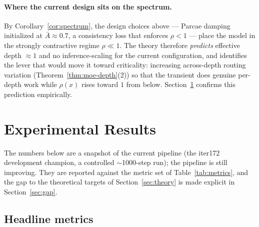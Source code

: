 \documentclass[11pt]{article}
\begin{document}
\paragraph{Where the current design sits on the spectrum.}
By Corollary~\ref{cor:spectrum}, the design choices above --- Parcae damping initialized at
$\bar A\approx0.7$, a consistency loss that enforces $\rho<1$ --- place the model in the strongly
contractive regime $\rho\ll1$.  The theory therefore \emph{predicts} effective depth
$\approx1$ and no inference-scaling for the current configuration, and identifies the lever that
would move it toward criticality: increasing across-depth routing variation
(Theorem~\ref{thm:moe-depth}(2)) so that the transient does genuine per-depth work while $\rho(x)$
rises toward $1$ from below.  Section~\ref{sec:results} confirms this prediction empirically.

\section{Experimental Results}
\label{sec:results}

The numbers below are a snapshot of the current pipeline (the iter172 development champion, a
controlled $\sim$1000-step run); the pipeline is still improving.  They are reported against the
metric set of Table~\ref{tab:metrics}, and the gap to the theoretical targets of
Section~\ref{sec:theory} is made explicit in Section~\ref{sec:gap}.

\subsection{Headline metrics}
\label{sec:headline}
\end{document}
